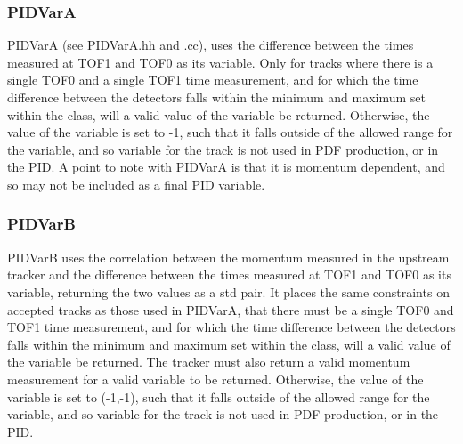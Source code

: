 \subsubsection{PIDVarA}
\label{PIDVarA}
PIDVarA (see PIDVarA.hh and .cc), uses the difference between the times measured at TOF1 
and TOF0 as its variable. Only for tracks where there is a single TOF0 
and a single TOF1 time measurement, and for which the time difference 
between the detectors falls within the minimum and maximum set within 
the class, will a valid value of the variable be returned. Otherwise, 
the value of the variable is set to -1, such that it falls outside of 
the allowed range for the variable, and so variable for the track is 
not used in PDF production, or in the PID. 
A point to note with PIDVarA is that it is momentum dependent, and 
so may not be included as a final PID variable.

% 

\subsubsection{PIDVarB}
\label{PIDVarB}
PIDVarB uses the correlation between the momentum measured in the upstream tracker 
and the difference between the times measured at TOF1 and TOF0 as its variable, returning the two 
values as a std pair. It places the same constraints on accepted tracks as those used in PIDVarA, that 
there must be a single TOF0 and TOF1 time measurement, and for which the time difference 
between the detectors falls within the minimum and maximum set within 
the class, will a valid value of the variable be returned. The tracker must also return a 
valid momentum measurement for a valid variable to be returned. Otherwise, 
the value of the variable is set to (-1,-1), such that it falls outside of 
the allowed range for the variable, and so variable for the track is 
not used in PDF production, or in the PID. 

% 
